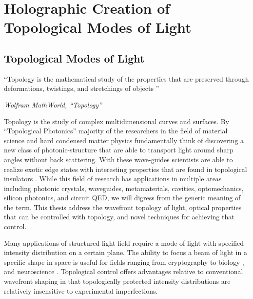 \chapter{Holographic Creation of Topological Modes of Light}
\label{ch:topological_modes}

\section{Topological Modes of Light}

\setlength{\epigraphwidth}{0.8\textwidth}
\epigraph{``Topology is the mathematical study of the properties that are preserved through deformations, twistings, and stretchings of objects \cite{topology}''}{\textit{Wolfram MathWorld, ``Topology''}}

Topology is the study of complex multidimensional curves and surfaces. By ``Topological Photonics'' \cite{leykam2016, Zhou_2017} majority of the researchers in the field of material science and hard condensed matter physics fundamentally think of discovering a new class of photonic-structure \cite{Barik666} that are able to transport light around sharp angles without back scattering. With these wave-guides scientists are able to realize exotic edge states with interesting properties that are found  in topological insulators \cite{hsieh2008, haldane20107}. While this field of research has applications in multiple areas \cite{ozawa2019} including photonic crystals, waveguides, metamaterials, cavities, optomechanics, silicon photonics, and circuit QED, we will digress from the generic meaning of the term.
This thesis address the wavefront topology of light, optical properties that can be controlled with topology, and novel techniques for achieving that control.

Many applications of structured light field require a mode of light with specified intensity distribution on a certain plane. The ability to focus a beam of light in a specific shape in space is useful for fields ranging from cryptography \cite{Horstmeyer2013, Horstmeyer2013cleo} to biology \cite{wang2012, Papadopoulos:12}, and neuroscience \cite{Finisguerra2019, VAZIRI2012128, Deisseroth2005,Black13}.
Topological control offers advantages relative to conventional wavefront shaping in that topologically protected intensity distributions are relatively insensitive to experimental imperfections.

